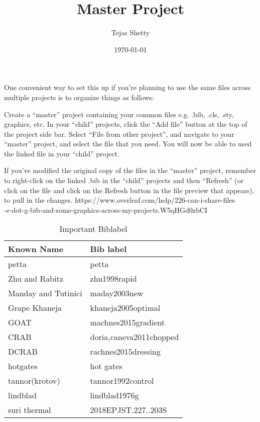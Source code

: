 \documentclass{article}
\begin{document}
\title{Master Project}
\author{Tejas Shetty}
\date{\today} %
\maketitle
One convenient way to set this up if you're planning to use the same files across multiple projects is to organize things as follows:

Create a “master” project containing your common files e.g. .bib, .cls, .sty, graphics, etc.
In your “child” projects, click the “Add file” button at the top of the project side bar.
Select “File from other project”, and navigate to your “master” project, and select the file that you need.
You will now be able to used the linked file in your “child” project.

If you’ve modified the original copy of the files in the “master” project, remember to right-click on the linked .bib in the “child” projects and then “Refresh” (or click on the file and click on the Refresh button in the file preview that appears), to pull in the changes.
\cite{maday2003new}
{https://www.overleaf.com/help/226-can-i-share-files\\
-e-dot-g-bib-and-some-graphics-across-my-projects.W5qHGd0zbCI}\\




\begin{table}[!ht]
\centering
\begin{tabular}{l|l}
Known Name & Bib label \\\hline
petta & petta \\
Zhu and Rabitz & zhu1998rapid\\
Manday and Tutinici & maday2003new\\
Grape Khaneja & khaneja2005optimal\\
GOAT & machnes2015gradient\\
CRAB & doria,caneva2011chopped\\
DCRAB & rachnes2015dressing\\
hotgates & hot gates\\
tannor(krotov) & tannor1992control\\
lindblad & lindblad1976g\\
suri thermal & 2018EPJST.227..203S
\end{tabular}
\caption{\label{tab:Important  Biblabel}Important  Biblabel}
\end{table}
\end{document}
